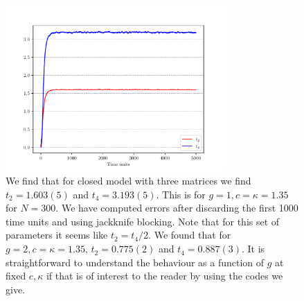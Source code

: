 \documentclass[letter,11pt]{article}
\begin{document}
\begin{figure}[htbp] 
	\centering 
	\includegraphics[width=0.75\textwidth]{figs/3MM_closed.pdf}
	\caption{\label{fig:3MM_closed}We find that for closed model with three matrices we find $t_{2} = 1.603(5)$ and $t_{4} = 3.193(5)$. 
	This is for $g=1, c=\kappa=1.35$ for $N=300$. We have computed errors after discarding the first 1000 time units and 
	using jackknife blocking. Note that for this set of parameters it seems like $t_{2} = t_{4}/2$. We found that 
	for $g=2, c=\kappa=1.35$, $t_{2} = 0.775(2)$ and $t_{4} = 0.887(3)$. It is straightforward to understand the behaviour as a function of $g$ at fixed $c, \kappa$ if that is of interest to the reader by using the codes we give.}
\end{figure}
\end{document}
